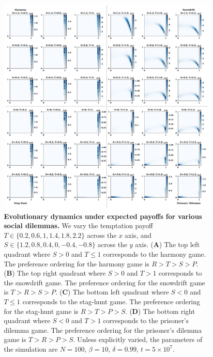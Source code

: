 \documentclass[11pt]{article}
\theoremstyle{plainCl1}
\theoremstyle{plainCl2}
\begin{document}
\begin{figure}[!htbp]
  \centering
  \includegraphics[width=\textwidth]{static/expected_two_by_two_games.pdf}
  \caption{{\bf Evolutionary dynamics under expected payoffs for various social dilemmas.}
  We vary the temptation payoff \(T \in \{0.2, 0.6, 1, 1.4, 1.8, 2.2\}\) across
  the \(x\) axis, and  \(S \in \{1.2, 0.8, 0.4, 0, -0.4, -0.8\}\) across the
  \(y\) axis. ({\bf A}) The top left quadrant where \(S > 0\) and \(T \leq 1\)
  corresponds to the harmony game. The preference ordering for the harmony game
  is \(R > T > S > P\). ({\bf B}) The top right quadrant where \(S > 0\) and \(T > 1\)
  corresponds to the snowdrift game. The preference ordering for the snowdrift game
  is \(T > R > S > P\). ({\bf C}) The bottom left quadrant where \(S < 0\) and \(T \leq 1\)
  corresponds to the stag-hunt game. The preference ordering for the stag-hunt game
  is \(R > T > P > S\). ({\bf D}) The bottom right quadrant where \(S < 0\) and \(T > 1\)
  corresponds to the prisoner's dilemma game. The preference ordering for the prisoner's dilemma game
  is \(T > R > P > S\).
  Unless explicitly varied, the parameters of the simulation
  are $N\!=\!100$, $\beta\!=\!10$, $\delta\!=\!0.99$, $t\!=\!5\times 10^7$.}
  \label{fig:expected_two_by_two}
\end{figure}
\end{document}
